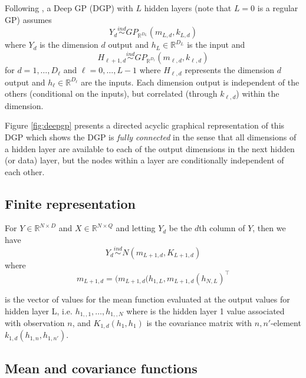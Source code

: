 \documentclass{article}
\newcommand{\ind}{\stackrel{ind}{\sim}}
\newcommand{\1}{\mathbbm{1}}
\begin{document}
Following \cite{damianou2013deep},
a Deep GP (DGP) with $L$ hidden layers 
(note that $L=0$ is a regular GP) assumes
\begin{equation}
Y_d \ind GP_{\mathbb{R}^{D_{L}}}(m_{L,d},k_{L,d})
\label{eq:y}
\end{equation}
where $Y_d$ is the dimension $d$ output and $h_{L} \in \mathbb{R}^{D_{L}}$ is 
the input and
\begin{equation}
H_{\ell+1,d} \ind GP_{\mathbb{R}^{D_{\ell}}}(m_{\ell,d},k_{\ell,d})
\end{equation}
for $d=1,\ldots,D_{\ell}$ and $\ell = 0,\ldots,L-1$
where $H_{\ell,d}$ represents the dimension $d$ output and
$h_{\ell} \in \mathbb{R}^{D_{\ell}}$ are the inputs.
Each dimension output is independent of the others (conditional on the inputs),
but correlated (through $k_{\ell,d}$) within the dimension.





Figure \ref{fig:deepgp} presents a directed acyclic graphical representation
of this DGP which shows the DGP is \emph{fully connected} in the sense that all
dimensions of a hidden layer are available to each of the output dimensions
in the next hidden (or data) layer,
but the nodes within a layer are conditionally independent of each other.









\subsection{Finite representation}

For $Y \in \mathbb{R}^{N \times D}$ and $X\in \mathbb{R}^{N\times Q}$
and letting $Y_d$ be the $d$th column of $Y$,
then we have
\[
Y_d \ind N(m_{L+1,d}, K_{L+1,d})
\]
where
\[
m_{L+1,d} = (m_{L+1,d}(h_{1,L},m_{L+1,d}(h_{N,L})^\top
\]

is the vector of values for the mean function evaluated at the output values for
hidden layer L, i.e. $h_{1,,1},\ldots,h_{1,,N}$ where
is the hidden layer 1 value associated with observation $n$, and
$K_{1,d}(h_1,h_1)$ is the covariance matrix with $n,n'$-element
$k_{1,d}(h_{1,n},h_{1,n'})$.


\subsection{Mean and covariance functions}
\end{document}
